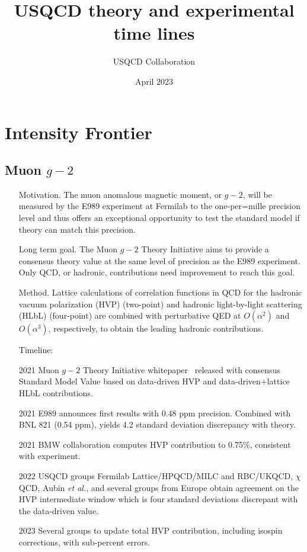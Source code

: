 \documentclass{article}
\title{USQCD theory and experimental time lines}
\author{USQCD Collaboration}
\date{April 2023}
\begin{document}
\maketitle
\tableofcontents
\section{Intensity Frontier}\label{sec:intensity}

\subsection{Muon $g-2$}
\begin{itemize}
    \item[Motivation.] The muon anomalous magnetic moment, or $g-2$, will be measured by the E989 experiment at Fermilab to the one-per=mille precision level and thus offers an exceptional opportunity to test the standard model if theory can match this precision.
    \item[Long term goal.] The Muon $g-2$ Theory Initiative aims to provide a consensus theory value at the same level of precision as the E989 experiment. Only QCD, or hadronic, contributions need improvement to reach this goal.
\item[Method.] Lattice  calculations of correlation functions in QCD for the hadronic vacuum polarization (HVP) (two-point) and hadronic light-by-light scattering (HLbL) (four-point) are combined with perturbative QED at $O(\alpha^2)$ and $O(\alpha^3)$, respectively, to obtain the leading hadronic contributions.
\item[Timeline:]
    \item[2021] Muon $g-2$ Theory Initiative whitepaper~\cite{Aoyama:2020ynm} released with consensus Standard Model Value based on data-driven HVP and data-driven+lattice HLbL contributions.
    \item[2021] E989 announces first results with 0.48 ppm precision. Combined with BNL 821 (0.54 ppm), yields 4.2 standard deviation discrepancy with theory.
    \item[2021] BMW collaboration computes HVP contribution to 0.75\%, consistent with experiment. 
    \item[2022] USQCD groups Fermilab Lattice/HPQCD/MILC and RBC/UKQCD, $\chi$QCD, Aubin {\it et al.}, and several groups from Europe obtain agreement on the HVP intermediate window which is four standard deviations discrepant with the data-driven value.
    \item[2023] Several groups to update total HVP contribution, including isospin corrections, with sub-percent errors.

\end{itemize}
\end{document}
